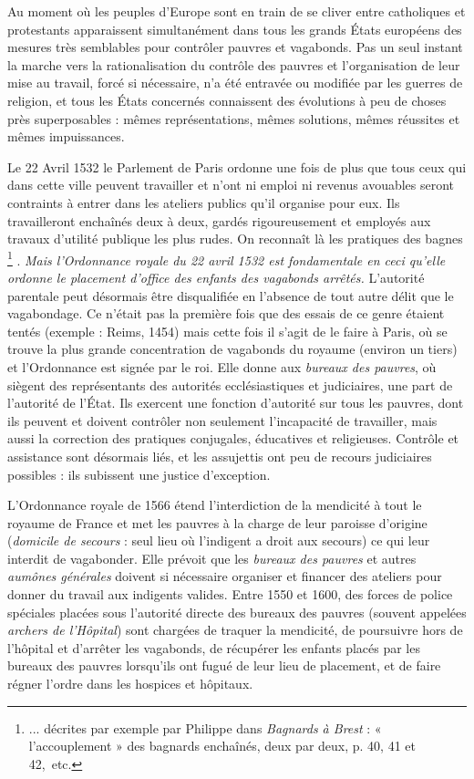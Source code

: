  Au moment où les peuples d'Europe sont en train de se cliver entre catholiques et protestants apparaissent simultanément dans tous les grands États européens des mesures très semblables pour contrôler pauvres et vagabonds. Pas un seul instant la marche vers la rationalisation du contrôle des pauvres et l'organisation de leur mise au travail, forcé si nécessaire, n'a été entravée ou modifiée par les guerres de religion, et tous les États concernés connaissent des évolutions à peu de choses près superposables : mêmes représentations, mêmes solutions, mêmes réussites et mêmes impuissances. 

 Le 22 Avril 1532 le Parlement de Paris ordonne une fois de plus que tous ceux qui dans cette ville peuvent travailler et n'ont ni emploi ni revenus avouables seront contraints à entrer dans les ateliers publics qu'il organise pour eux. Ils travailleront enchaînés deux à deux, gardés rigoureusement et employés aux travaux d'utilité publique les plus rudes. On reconnaît là les pratiques des bagnes%
\footnote{... décrites par exemple par Philippe  dans \emph{Bagnards à Brest} : « l'accouplement » des bagnards enchaînés, deux par deux, p. 40, 41 et 42,~etc.}%
. \emph{Mais l'Ordonnance royale du 22 avril 1532 est fondamentale en ceci qu'elle ordonne le placement d'office des enfants des vagabonds arrêtés.} L'autorité parentale peut désormais être disqualifiée en l'absence de tout autre délit que le vagabondage. Ce n'était pas la première fois que des essais de ce genre étaient tentés (exemple : Reims, 1454) mais cette fois il s'agit de le faire à Paris, où se trouve la plus grande concentration de vagabonds du royaume (environ un tiers) et l'Ordonnance est signée par le roi. Elle donne aux \emph{bureaux des pauvres}, où siègent des représentants des autorités ecclésiastiques et judiciaires, une part de l'autorité de l'État. Ils exercent une fonction d'autorité sur tous les pauvres, dont ils peuvent et doivent contrôler non seulement l'incapacité de travailler, mais aussi la correction des pratiques conjugales, éducatives et religieuses. Contrôle et assistance sont désormais liés, et les assujettis ont peu de recours judiciaires possibles : ils subissent une justice d'exception. 

 L'Ordonnance royale de 1566 étend l'interdiction de la mendicité à tout le royaume de France et met les pauvres à la charge de leur paroisse d'origine (\emph{domicile de secours} : seul lieu où l'indigent a droit aux secours) ce qui leur interdit de vagabonder. Elle prévoit que les \emph{bureaux des pauvres} et autres \emph{aumônes générales} doivent si nécessaire organiser et financer des ateliers pour donner du travail aux indigents valides. Entre 1550 et 1600, des forces de police spéciales placées sous l'autorité directe des {bureaux des pauvres} (souvent appelées \emph{archers de l'Hôpital}) sont chargées de traquer la mendicité, de poursuivre hors de l'hôpital et d'arrêter les vagabonds, de récupérer les enfants placés par les bureaux des pauvres lorsqu'ils ont fugué de leur lieu de placement, et de faire régner l'ordre dans les hospices et hôpitaux. 

